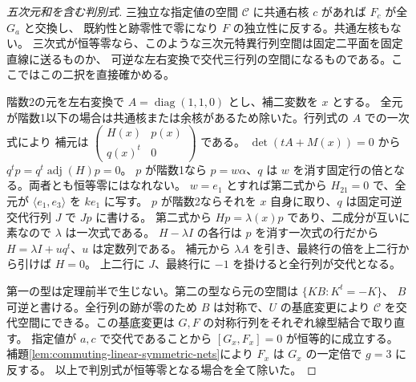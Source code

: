 \begin{proof}[五次元和を含む判別式]
三独立な指定値の空間 $\mathcal C$ に共通右核 $c$ があれば $F_c$ が全 $G_a$ と交換し、
既約性と跡零性で零になり $F$ の独立性に反する。共通左核もない。
三次式が恒等零なら、このような三次元特異行列空間は固定二平面を固定直線に送るものか、
可逆な左右変換で交代三行列の空間になるものである。ここではこの二択を直接確かめる。

階数2の元を左右変換で $A=\operatorname{diag}(1,1,0)$ とし、補二変数を $x$ とする。
全元が階数1以下の場合は共通核または余核があるため除いた。行列式の $A$ での一次式により
補元は $\left(\begin{smallmatrix}H(x)&p(x)\\q(x)^t&0\end{smallmatrix}\right)$ である。
$\det(tA+M(x))=0$ から $q^tp=q^t\operatorname{adj}(H)p=0$。
$p$ が階数1なら $p=w\alpha$、$q$ は $w$ を消す固定行の倍となる。両者とも恒等零にはなれない。
$w=e_1$ とすれば第二式から $H_{21}=0$ で、全元が $\langle e_1,e_3\rangle$ を $ke_1$ に写す。
$p$ が階数2ならそれを $x$ 自身に取り、$q$ は固定可逆交代行列 $J$ で $Jp$ に書ける。
第二式から $Hp=\lambda(x)p$ であり、二成分が互いに素なので $\lambda$ は一次式である。
$H-\lambda I$ の各行は $p$ を消す一次式の行だから $H=\lambda I+u q^t$、$u$ は定数列である。
補元から $\lambda A$ を引き、最終行の倍を上二行から引けば $H=0$。
上二行に $J$、最終行に $-1$ を掛けると全行列が交代となる。

第一の型は定理前半で生じない。第二の型なら元の空間は $\{KB:K^t=-K\}$、
$B$ 可逆と書ける。全行列の跡が零のため $B$ は対称で、$U$ の基底変更により
$\mathcal C$ を交代空間にできる。この基底変更は $G,F$ の対称行列をそれぞれ線型結合で取り直す。
指定値が $a,c$ で交代であることから $[G_x,F_x]=0$ が恒等的に成立する。
補題\ref{lem:commuting-linear-symmetric-nets}により $F_x$ は $G_x$ の一定倍で $g=3$ に反する。
以上で判別式が恒等零となる場合を全て除いた。
\end{proof}
